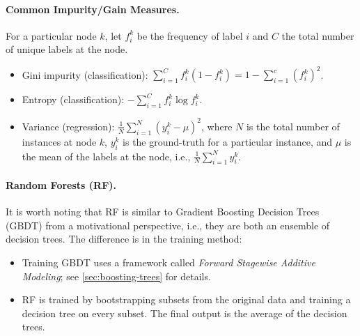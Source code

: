     \paragraph{Common Impurity/Gain Measures.}
    For a particular node $k$, let $f^k_i$ be the frequency of label $i$ and $C$ the total number of unique labels at the node.
    \begin{itemize}
        \item Gini impurity (classification): $\sum_{i=1}^{C}{f^k_i (1 - f^k_i)} = 1 - \sum_{i=1}^{c}{(f_i^k)^2}$.
        \item Entropy (classification): $-\sum_{i=1}^{C}{f^k_i \log f^k_i}$.
        \item Variance (regression): $\frac{1}{N}\sum_{i=1}^{N}{(y^k_i - \mu)^2}$, where $N$ is the total number of instances at node $k$, $y^k_i$ is the ground-truth for a particular instance, and $\mu$ is the mean of the labels at the node, i.e., $\frac{1}{N}\sum_{i=1}^{N}{y^k_i}$.
    \end{itemize}
    
    
    
    \paragraph{Random Forests (RF).} It is worth noting that RF is similar to Gradient Boosting Decision Trees (GBDT) from a motivational perspective, i.e., they are both an ensemble of decision trees.
    The difference is in the training method:
        \begin{itemize}
            \item Training GBDT uses a framework called \emph{Forward Stagewise Additive Modeling}; see \ref{sec:boosting-trees} for details.
            \item RF is trained by bootstrapping subsets from the original data and training a decision tree on every subset. 
            The final output is the average of the decision trees.
        \end{itemize}



